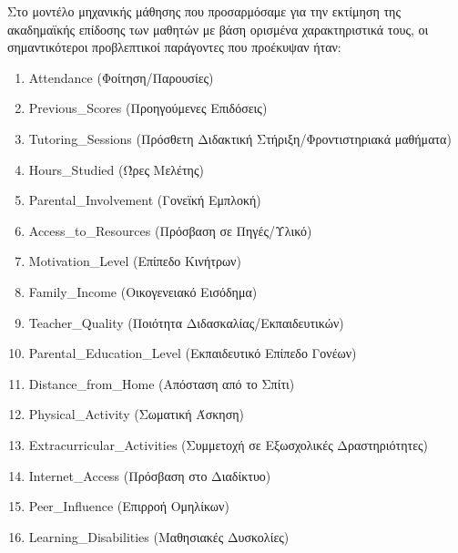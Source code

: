 \documentclass[12pt]{article}
\begin{document}
Στο μοντέλο μηχανικής μάθησης που προσαρμόσαμε για την εκτίμηση της ακαδημαϊκής επίδοσης των μαθητών 
με βάση ορισμένα χαρακτηριστικά τους, οι σημαντικότεροι προβλεπτικοί παράγοντες που προέκυψαν ήταν:\\

\begin{enumerate}

  \item Attendance (Φοίτηση/Παρουσίες)
  
  \item Previous\_{Scores} (Προηγούμενες Επιδόσεις)
  
  \item Tutoring\_{Sessions} (Πρόσθετη Διδακτική Στήριξη/Φροντιστηριακά μαθήματα)
  
  \item Hours\_{Studied} (Ώρες Μελέτης)
  
  \item Parental\_{Involvement} (Γονεϊκή Εμπλοκή)
  
  \item Access\_{to}\_{Resources} (Πρόσβαση σε Πηγές/Υλικό)
  
  \item Motivation\_{Level} (Επίπεδο Κινήτρων)
  
  \item Family\_{Income} (Οικογενειακό Εισόδημα)
  
  \item Teacher\_{Quality} (Ποιότητα Διδασκαλίας/Εκπαιδευτικών)
  
  \item Parental\_{Education}\_{Level} (Εκπαιδευτικό Επίπεδο Γονέων)
  
  \item Distance\_{from}\_{Home} (Απόσταση από το Σπίτι)
  
  \item Physical\_{Activity} (Σωματική Άσκηση)
  
  \item Extracurricular\_{Activities} (Συμμετοχή σε Εξωσχολικές Δραστηριότητες)
  
  \item Internet\_{Access} (Πρόσβαση στο Διαδίκτυο)
  
  \item Peer\_{Influence} (Επιρροή Ομηλίκων)
  
  \item Learning\_{Disabilities} (Μαθησιακές Δυσκολίες)
  
\end{enumerate}
\end{document}
